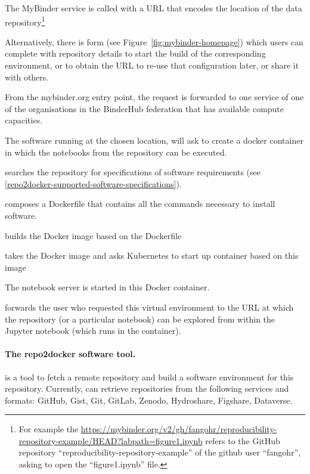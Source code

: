 \begin{compactitem}
\item The MyBinder service is called with a URL that encodes the location of the data
  repository\footnote{For example the 
    {\url{https://mybinder.org/v2/gh/fangohr/reproducibility-repository-example/HEAD?labpath=figure1.ipynb}}
    refers to the GitHub repository ``reproducibility-repository-example'' of the
    github user ``fangohr'', asking to open the ``figure1.ipynb'' file.}

  Alternatively, there is form (see Figure~\ref{fig:mybinder-homepage})
  which users can complete with repository details
  to start the build of the corresponding environment, or to obtain the URL to
  re-use that configuration later, or share it with others.
\item From the mybinder.org entry point, the request is forwarded to one
  \binderhub{} service of one of the organisations in the BinderHub federation
  that has available compute capacities.
\item The \binderhub{} software running at the chosen location, will ask
  \repotodocker{} to create a docker container in which the notebooks from the repository can be executed.
\item \repotodocker{} searches the repository for specifications of software requirements (see \ref{repo2docker-supported-software-specifications}).
\item \repotodocker{} composes a Dockerfile that contains all the commands
  necessary to install software.
\item \repotodocker{} builds the Docker image based on the Dockerfile
\item \binderhub{} takes the Docker image and asks Kubernetes to start up
  container based on this image
\item The notebook server is started in this Docker container.
\item \binderhub{} forwards the user who requested this virtual environment to
  the URL at which the repository (or a particular notebook) can be explored
  from within the Jupyter notebook (which runs in the container).
\end{compactitem}

\paragraph{The repo2docker software tool.}\label{sec:repo2docker}

\repotodocker{} is a tool to fetch a remote repository and build a software
environment for this repository. Currently, \repotodocker{} can retrieve
repositories from the following services and formats: GitHub, Gist, Git, GitLab,
Zenodo, Hydroshare, Figshare, Dataverse.

